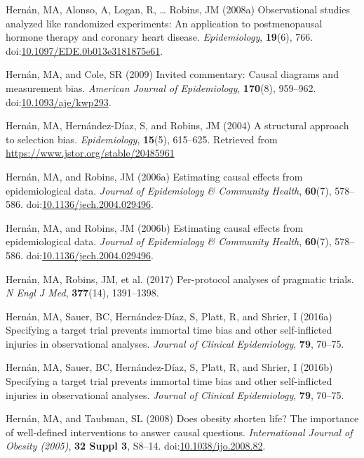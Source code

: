 \documentclass[
  single column]{article}
\newlength{\cslhangindent}
\newenvironment{CSLReferences}[2] %
 {\begin{list}{}{%
  \setlength{\itemindent}{0pt}
  \setlength{\leftmargin}{0pt}
  \setlength{\parsep}{0pt}
  \ifodd #1
   \setlength{\leftmargin}{\cslhangindent}
   \setlength{\itemindent}{-1\cslhangindent}
  \fi
  \setlength{\itemsep}{#2\baselineskip}}}
 {\end{list}}
\begin{document}
\begin{CSLReferences}{1}{0}
Hernán, MA, Alonso, A, Logan, R, \ldots{} Robins, JM (2008a)
Observational studies analyzed like randomized experiments: An
application to postmenopausal hormone therapy and coronary heart
disease. \emph{Epidemiology}, \textbf{19}(6), 766.
doi:\href{https://doi.org/10.1097/EDE.0b013e3181875e61}{10.1097/EDE.0b013e3181875e61}.

Hernán, MA, and Cole, SR (2009) Invited commentary: Causal diagrams and
measurement bias. \emph{American Journal of Epidemiology},
\textbf{170}(8), 959--962.
doi:\href{https://doi.org/10.1093/aje/kwp293}{10.1093/aje/kwp293}.

Hernán, MA, Hernández-Díaz, S, and Robins, JM (2004) A structural
approach to selection bias. \emph{Epidemiology}, \textbf{15}(5),
615--625. Retrieved from \url{https://www.jstor.org/stable/20485961}

Hernán, MA, and Robins, JM (2006a) Estimating causal effects from
epidemiological data. \emph{Journal of Epidemiology \& Community
Health}, \textbf{60}(7), 578--586.
doi:\href{https://doi.org/10.1136/jech.2004.029496}{10.1136/jech.2004.029496}.

Hernán, MA, and Robins, JM (2006b) Estimating causal effects from
epidemiological data. \emph{Journal of Epidemiology \& Community
Health}, \textbf{60}(7), 578--586.
doi:\href{https://doi.org/10.1136/jech.2004.029496}{10.1136/jech.2004.029496}.

Hernán, MA, Robins, JM, et al. (2017) Per-protocol analyses of pragmatic
trials. \emph{N Engl J Med}, \textbf{377}(14), 1391--1398.

Hernán, MA, Sauer, BC, Hernández-Díaz, S, Platt, R, and Shrier, I
(2016a) Specifying a target trial prevents immortal time bias and other
self-inflicted injuries in observational analyses. \emph{Journal of
Clinical Epidemiology}, \textbf{79}, 70--75.

Hernán, MA, Sauer, BC, Hernández-Díaz, S, Platt, R, and Shrier, I
(2016b) Specifying a target trial prevents immortal time bias and other
self-inflicted injuries in observational analyses. \emph{Journal of
Clinical Epidemiology}, \textbf{79}, 70--75.

Hernán, MA, and Taubman, SL (2008) Does obesity shorten life? The
importance of well-defined interventions to answer causal questions.
\emph{International Journal of Obesity (2005)}, \textbf{32 Suppl 3},
S8--14.
doi:\href{https://doi.org/10.1038/ijo.2008.82}{10.1038/ijo.2008.82}.


\end{CSLReferences}
\end{document}
